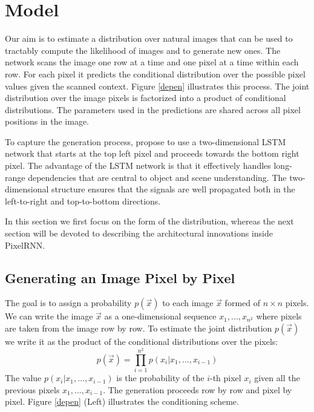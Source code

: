 \section{Model}
\label{framework}


Our aim is to estimate a distribution over natural images that can be used to tractably compute the likelihood of images and to generate new ones. The network scans the image one row at a time and one pixel at a time within each row.  For each pixel it predicts the conditional distribution over the possible pixel values given the scanned context. Figure \ref{depen} illustrates this process. The joint distribution over the image pixels is factorized into a product of conditional distributions. The parameters used in the predictions are shared across all pixel positions in the image. 

To capture the generation process, \citet{theis2015generative} propose to use a two-dimensional LSTM network \cite{graves2009offline} that starts at the top left pixel and proceeds towards the bottom right pixel. The advantage of the LSTM network is that it effectively handles long-range dependencies that are central to object and scene understanding. The two-dimensional structure ensures that the signals are well propagated both in the left-to-right and top-to-bottom directions. 

In this section we first focus on the form of the distribution,
whereas the next section will be devoted to describing the architectural innovations inside PixelRNN.


\subsection{Generating an Image Pixel by Pixel}

The goal is to assign a probability $p(\vec{x})$ to each image $\vec{x}$ formed of $n \times n$ pixels. We can write the image $\vec{x}$ as a one-dimensional sequence $x_1,...,x_{n^2}$ where pixels are taken from the image row by row. To estimate the joint distribution $p(\vec{x})$ we write it as the product of the conditional distributions over the pixels:
\vspace{-0.3cm}
\begin{equation}
p(\vec{x}) = \prod_{i=1}^{n^2} p(x_i | x_1,...,x_{i-1})
\end{equation}
The value $p(x_i | x_1,...,x_{i-1})$ is the probability of the $i$-th pixel $x_i$ given all the previous pixels $x_1,...,x_{i-1}$. The generation proceeds row by row and pixel by pixel. Figure \ref{depen} (Left) illustrates the conditioning scheme.


